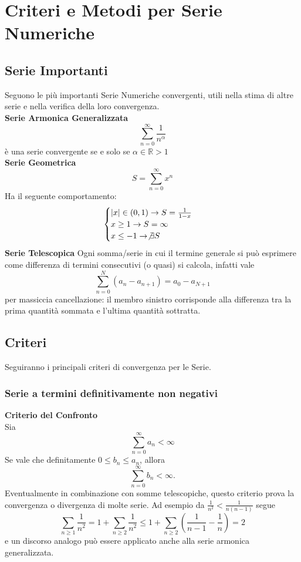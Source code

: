 \documentclass[a4paper,twoside]{article}
\newcommand{\R}{\mathbb{R}}
\theoremstyle{definition}
\numberwithin{theorem}{section}
\begin{document}
    \section{Criteri e Metodi per Serie Numeriche}
    \subsection{Serie Importanti}
Seguono le più importanti Serie Numeriche convergenti, utili nella stima di altre serie e nella verifica della loro convergenza.\\
\textbf{Serie Armonica Generalizzata}
$$\sum_{n=0}^{\infty}\frac{1}{n^\alpha}$$
è una serie convergente se e solo se
$\alpha\in\R>1$
\\
\textbf{Serie Geometrica}
$$S=\sum_{n=0}^{\infty}x^n$$
Ha il seguente comportamento:
\begin{equation*}
\begin{cases}
    |x|\in(0,1) \rightarrow S=\frac{1}{1-x}
    \\x \geq 1 \rightarrow S=\infty
    \\x\leq -1 \rightarrow \not\exists S
    
\end{cases}
\end{equation*}
\textbf{Serie Telescopica}
Ogni somma/serie in cui il termine generale si può esprimere come differenza di termini consecutivi (o quasi) si calcola, infatti vale
$$\sum_{n=0}^{N}\left(a_n - a_{n+1}\right) = a_0 - a_{N+1}$$
per massiccia cancellazione: il membro sinistro corrisponde alla differenza tra la prima quantità sommata e l'ultima quantità sottratta.
\subsection{Criteri}
Seguiranno i principali criteri di convergenza per le Serie.
\subsubsection{Serie a termini definitivamente non negativi}
\textbf{Criterio del Confronto} \\
Sia
$$\sum_{n=0}^{\infty}a_n<\infty$$
Se vale che definitamente $0\leq b_n\leq a_n$, allora
$$\sum_{n=0}^{\infty}b_n<\infty.$$
Eventualmente in combinazione con somme telescopiche, questo criterio prova la convergenza o divergenza di molte serie. Ad esempio da $\frac{1}{n^2}<\frac{1}{n(n-1)}$ segue 
$$ \sum_{n\geq 1}\frac{1}{n^2} = 1+\sum_{n\geq 2}\frac{1}{n^2} \leq 1+\sum_{n\geq 2}\left(\frac{1}{n-1}-\frac{1}{n}\right) = 2 $$
e un discorso analogo può essere applicato anche alla serie armonica generalizzata.\\
\end{document}
